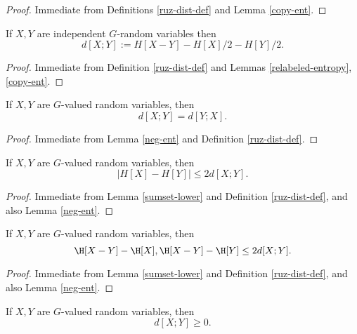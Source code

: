 \begin{proof}  Immediate from Definitions \ref{ruz-dist-def} and Lemma \ref{copy-ent}.
\end{proof}

\begin{lemma}\label{ruz-indep} If $X,Y$ are independent $G$-random variables then
  $$ d[X;Y] := H[X - Y] - H[X]/2 - H[Y]/2.$$
\end{lemma}

\begin{proof}  Immediate from Definition \ref{ruz-dist-def} and Lemmas \ref{relabeled-entropy}, \ref{copy-ent}.
\end{proof}

\begin{lemma}\label{ruzsa-symm} If $X,Y$ are $G$-valued random variables, then
  $$ d[X;Y] = d[Y;X].$$
\end{lemma}

\begin{proof}  Immediate from Lemma \ref{neg-ent} and Definition \ref{ruz-dist-def}.
\end{proof}

\begin{lemma}\label{ruzsa-diff} If $X,Y$ are $G$-valued random variables, then
$$|H[X]-H[Y]| \leq 2 d[X;Y].$$
\end{lemma}

\begin{proof}  Immediate from Lemma \ref{sumset-lower} and Definition \ref{ruz-dist-def}, and also Lemma \ref{neg-ent}.
\end{proof}

\begin{lemma}\label{ruzsa-growth} If $X,Y$ are $G$-valued random variables, then
$$  \H[X-Y] - \H[X], \H[X-Y] - \H[Y] \leq 2d[X;Y].$$
\end{lemma}

\begin{proof}  Immediate from Lemma \ref{sumset-lower} and Definition \ref{ruz-dist-def}, and also Lemma \ref{neg-ent}.
\end{proof}

\begin{lemma}\label{ruzsa-nonneg} If $X,Y$ are $G$-valued random variables, then
  $$ d[X;Y] \geq 0.$$
\end{lemma}

